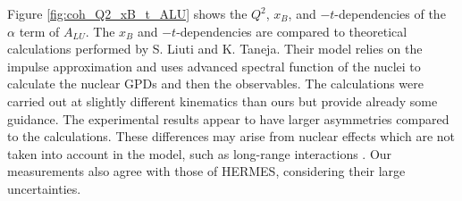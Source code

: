 Figure \ref{fig:coh_Q2_xB_t_ALU} shows the $Q^2$, $x_{B}$, and $-t$-dependencies of the $\alpha$ term of $A_{LU}$. The $x_{B}$ and $-t$-dependencies are compared to theoretical calculations performed by S. Liuti and K. Taneja. Their model relies on the impulse approximation and uses advanced spectral function of the nuclei to calculate the nuclear GPDs and then the observables. The calculations were carried out at slightly different kinematics than ours but provide already some guidance. The experimental results appear to have larger asymmetries compared to the calculations. These differences may arise from nuclear effects which are not taken into account in the model, such as long-range interactions \cite{simonetta_2}. Our measurements also agree with those of HERMES, considering their large uncertainties. \\

